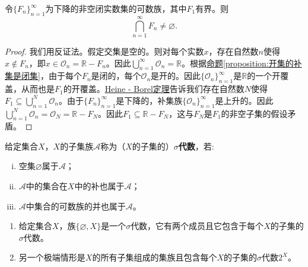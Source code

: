 \documentclass[lang=cn,newtx,10pt,scheme=chinese]{../Template/elegantbook}
\begin{document}
\begin{theorem}[集套定理]\label{theorem:集套定理}
  令\(\{F_n\}_{n = 1}^{\infty}\)为下降的非空闭实数集的可数族，其中\(F_1\)有界。则
\[\bigcap_{n = 1}^{\infty}F_n\neq\varnothing.\]
\end{theorem}
\begin{proof}
  我们用反证法。假定交集是空的。则对每个实数\(x\)，存在自然数\(n\)使得\(x\notin F_n\)，即\(x\in\mathcal{O}_n=\mathbb{R}- F_n\)。因此\(\bigcup_{n = 1}^{\infty}\mathcal{O}_n=\mathbb{R}\)。根据\hyperref[proposition:开集的补集是闭集]{命题\ref{proposition:开集的补集是闭集}}，由于每个\(F_n\)是闭的，每个\(\mathcal{O}_n\)是开的。因此\(\{\mathcal{O}_n\}_{n = 1}^{\infty}\)是\(\mathbb{R}\)的一个开覆盖，从而也是\(F_1\)的开覆盖。\hyperref[theorem:Heine - Borel定理]{Heine - Borel定理}告诉我们存在自然数\(N\)使得\(F_1\subseteq\bigcup_{n = 1}^{N}\mathcal{O}_n\)。由于\(\{F_n\}_{n = 1}^{\infty}\)是下降的，补集族\(\{\mathcal{O}_n\}_{n = 1}^{\infty}\)是上升的。因此\(\bigcup_{n = 1}^{N}\mathcal{O}_n=\mathcal{O}_N=\mathbb{R}- F_N\)。因此\(F_1\subseteq\mathbb{R}- F_N\)，这与\(F_N\)是\(F_1\)的非空子集的假设矛盾。

\end{proof}

\begin{definition}[$\sigma$代数]\label{definition: sigma 代数}
  给定集合\(X\)，\(X\)的子集族\(\mathcal{A}\)称为（\(X\)的子集的）\textbf{\(\sigma\)代数}，若:
  \begin{enumerate}[(i)]
    \item 空集\(\varnothing\)属于\(\mathcal{A}\)；

    \item \(\mathcal{A}\)中的集合在\(X\)中的补也属于\(\mathcal{A}\)；

    \item \(\mathcal{A}\)中集合的可数族的并也属于\(\mathcal{A}\)。
  \end{enumerate}
\end{definition}
\begin{note}
\begin{enumerate}[(1)]
  \item 给定集合\(X\)，族\(\{\varnothing, X\}\)是一个\(\sigma\)代数，它有两个成员且它包含于每个\(X\)的子集的\(\sigma\)代数。

  \item 另一个极端情形是\(X\)的所有子集组成的集族且包含每个\(X\)的子集的\(\sigma\)代数\(2^X\)。
\end{enumerate}
\end{note}
\end{document}
